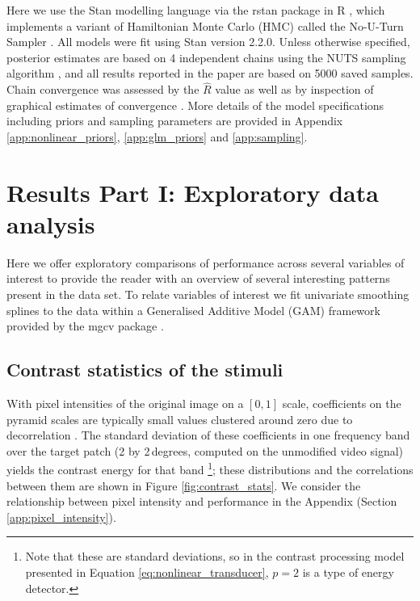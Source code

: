 \documentclass[11pt,a4paper]{article}
\begin{document}
Here we use the Stan modelling language \citep{StanDevelopmentTeam2014} via the rstan package in R \citep{RCoreDevelopmentTeam2013}, which implements a variant of Hamiltonian Monte Carlo (HMC) called the No-U-Turn Sampler \citep[NUTS;][]{Hoffman2014}.
All models were fit using Stan version 2.2.0.
Unless otherwise specified, posterior estimates are based on 4 independent chains using the NUTS sampling algorithm \citep{Hoffman2014}, and all results reported in the paper are based on 5000 saved samples.
Chain convergence was assessed by the $\hat{R}$ value \citep[the ratio of between-to-within chain variance; see][]{Gelman1992} as well as by inspection of graphical estimates of convergence \citep{Marin2014}.
More details of the model specifications including priors and sampling parameters are provided in Appendix \ref{app:nonlinear_priors}, \ref{app:glm_priors} and \ref{app:sampling}.


\section{Results Part I: Exploratory data analysis}
\label{sec:results_I}

Here we offer exploratory comparisons of performance across several variables of interest to provide the reader with an overview of several interesting patterns present in the data set.
To relate variables of interest we fit univariate smoothing splines to the data within a Generalised Additive Model (GAM) framework provided by the mgcv package \citep{Wood2011}.

\subsection{Contrast statistics of the stimuli}

With pixel intensities of the original image on a $[0, 1]$ scale, coefficients on the pyramid scales are typically small values clustered around zero due to decorrelation \citep{Adelson1981}.
The standard deviation of these coefficients in one frequency band over the target patch (2 by 2\,degrees, computed on the unmodified video signal) yields the contrast energy for that band \footnote{Note that these are standard deviations, so in the contrast processing model presented in Equation \ref{eq:nonlinear_transducer}, $p = 2$ is a type of energy detector.}; these distributions and the correlations between them are shown in Figure \ref{fig:contrast_stats}.
We consider the relationship between pixel intensity and performance in the Appendix (Section \ref{app:pixel_intensity}). 
\end{document}
